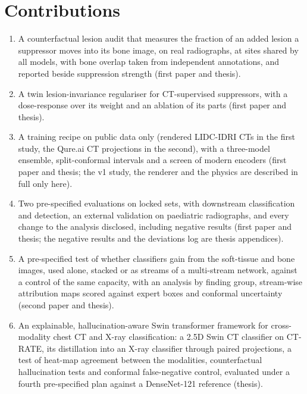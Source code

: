 \section{Contributions}
\begin{enumerate}
\item A counterfactual lesion audit that measures the fraction of an added lesion a suppressor moves into its bone image, on real radiographs,
 at sites shared by all models, with bone overlap taken from independent annotations, and reported beside suppression strength (first paper and
 thesis).
\item A twin lesion-invariance regulariser for CT-supervised suppressors, with a dose-response over its weight and an ablation of its parts
 (first paper and thesis).
\item A training recipe on public data only (rendered LIDC-IDRI CTs in the first study, the Qure.ai CT projections in the second), with a
 three-model ensemble, split-conformal intervals and a screen of modern encoders (first paper and thesis; the v1 study, the renderer and the
 physics are described in full only here).
\item Two pre-specified evaluations on locked sets, with downstream classification and detection, an external validation on paediatric
 radiographs, and every change to the analysis disclosed, including negative results (first paper and thesis; the negative results and the
 deviations log are thesis appendices).
\item A pre-specified test of whether classifiers gain from the soft-tissue and bone images, used alone, stacked or as streams of a multi-stream
 network, against a control of the same capacity, with an analysis by finding group, stream-wise attribution maps scored against expert boxes
 and conformal uncertainty (second paper and thesis).
\item An explainable, hallucination-aware Swin transformer framework for cross-modality chest CT and X-ray classification: a 2.5D Swin CT
 classifier on CT-RATE, its distillation into an X-ray classifier through paired projections, a test of heat-map agreement between the
 modalities, counterfactual hallucination tests and conformal false-negative control, evaluated under a fourth pre-specified plan against a
 DenseNet-121 reference (thesis).
\end{enumerate}

